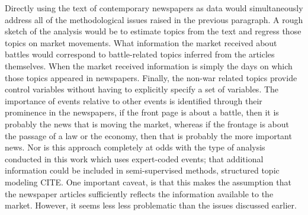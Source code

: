 Directly using the text of contemporary newspapers as data would simultaneously address all of the methodological issues raised in the previous paragraph.
A rough sketch of the analysis would be to estimate topics from the text and regress those topics on market movements.
What information the market received about battles would correspond to battle-related topics inferred from the articles themselves.
When the market received information is simply the days on which those topics appeared in newspapers.
Finally, the non-war related topics provide control variables without having to explicitly specify a set of variables.
The importance of events relative to other events is identified through their prominence in the newspapers, \eg{}if the front page is about a battle, then it is probably the news that is moving the market, whereas if the frontage is about the passage of a law or the economy, then that is probably the more important news.
Nor is this approach completely at odds with the type of analysis conducted in this work which uses expert-coded events; that additional information could be included in semi-supervised methods, \eg{}structured topic modeling CITE.
One important caveat, is that this makes the assumption that the newspaper articles sufficiently reflects the information available to the market.
However, it seems less less problematic than the issues discussed earlier.



